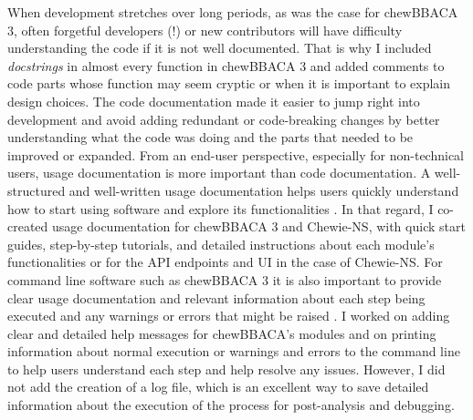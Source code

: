 When development stretches over long periods, as was the case for chewBBACA 3, often forgetful developers (!) or new contributors will have difficulty understanding the code if it is not well documented. That is why I included \textit{docstrings} in almost every function in chewBBACA 3 and added comments to code parts whose function may seem cryptic or when it is important to explain design choices. The code documentation made it easier to jump right into development and avoid adding redundant or code-breaking changes by better understanding what the code was doing and the parts that needed to be improved or expanded. From an end-user perspective, especially for non-technical users, usage documentation is more important than code documentation. A well-structured and well-written usage documentation helps users quickly understand how to start using software and explore its functionalities \cite{karimzadeh_top_2018}. In that regard, I co-created usage documentation for chewBBACA 3 and \ac{Chewie-NS}, with quick start guides, step-by-step tutorials, and detailed instructions about each module's functionalities or for the \ac{API} endpoints and \ac{UI} in the case of \ac{Chewie-NS}. For command line software such as chewBBACA 3 it is also important to provide clear usage documentation and relevant information about each step being executed and any warnings or errors that might be raised \cite{seemann_ten_2013}. I worked on adding clear and detailed help messages for chewBBACA's modules and on printing information about normal execution or warnings and errors to the command line to help users understand each step and help resolve any issues. However, I did not add the creation of a log file, which is an excellent way to save detailed information about the execution of the process for post-analysis and debugging. 

